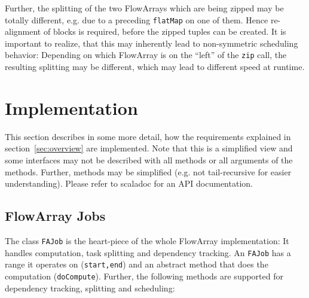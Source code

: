 \documentclass[runningheads,a4paper,fleqn]{llncs}
\begin{document}
Further, the splitting of the two FlowArrays which are being zipped
may be totally different, e.g. due to a preceding \texttt{flatMap} on
one of them. Hence re-alignment of blocks is required,
before the zipped tuples can be created. It is important to realize,
that this may inherently lead to non-symmetric scheduling behavior:
Depending on which FlowArray is on the ``left'' of the \texttt{zip}
call, the resulting splitting may be different, which may lead to
different speed at runtime. 

\section{Implementation}
\label{sec:implementation}

This section describes in some more detail, how the requirements
explained in section~\ref{sec:overview} are implemented. Note that
this is a simplified view and some interfaces may not be described
with all methods or all arguments of the methods. Further, methods may
be simplified (e.g. not tail-recursive for easier
understanding). Please refer to scaladoc for an API documentation.

\subsection{FlowArray Jobs}
The class \texttt{FAJob} is the heart-piece of the whole FlowArray
implementation: It handles computation, task splitting and dependency
tracking. An \texttt{FAJob} has a range it operates on
(\texttt{start,end}) and an abstract method that does the computation
(\texttt{doCompute}). Further, the following methods are supported for
dependency tracking, splitting and scheduling:
\end{document}
